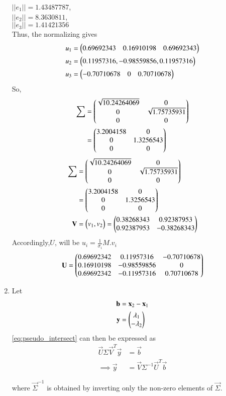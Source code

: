\documentclass[journal,12pt,twocolumn]{IEEEtran}
\renewcommand\thesection{\arabic{section}}
\begin{document}
\begin{enumerate}[label=\thesection.\arabic*.,ref=\thesection.\theenumi]
$||e_1||=1.43487787$,\\
$||e_2||=8.3630811$,\\
$||e_3||=1.41421356$\\
Thus, the normalizing gives 
\begin{align*}
&u_1=\begin{pmatrix}0.69692343 & 0.16910198 & 0.69692343\end{pmatrix}\\
&u_2=\begin{pmatrix}0.11957316,-0.98559856,0.11957316\end{pmatrix}\\
&u_3=\begin{pmatrix}-0.70710678 &0 & 0.70710678\end{pmatrix}
\end{align*}
So,
\begin{align*}
\sum&=\begin{pmatrix}\sqrt{10.24264069}	& 0\\0 & \sqrt{1.75735931}\\ 0 & 0\end{pmatrix} \\
&=\begin{pmatrix}3.2004158& 0\\0 & 1.3256543\\ 0 & 0\end{pmatrix}\\
\end{align*}
\begin{align*}
\sum&=\begin{pmatrix}\sqrt{10.24264069}	& 0\\0 & \sqrt{1.75735931}\\ 0 & 0\end{pmatrix} \\
&=\begin{pmatrix}3.2004158& 0\\0 & 1.3256543\\ 0 & 0\end{pmatrix}\\
\mathbf{V}&=\begin{pmatrix}v_1,v_2\end{pmatrix}=\begin{pmatrix}0.38268343 & 0.92387953\\ 0.92387953	& -0.38268343\end{pmatrix}\\
\end{align*}
Accordingly,$U$, will be $u_i=\frac{1}{\sigma_i}M.v_i$
\begin{align*}
\mathbf{U}=\begin{pmatrix}	0.69692342	& 0.11957316 & -0.70710678\\	
	0.16910198	& -0.98559856 & 0	\\
	0.69692342	&-0.11957316	& 0.70710678\end{pmatrix}
\end{align*}

\item Let
\begin{align*}
	\mathbf{b} &= 
	\mathbf{x}_2-\mathbf{x}_1
	\\
	\mathbf{y} &= \begin{pmatrix}\lambda_1 \\ - \lambda_2\end{pmatrix}
\end{align*}
\eqref{eq:pseudo_intersect}
can then be expressed as
\begin{align*}
\vec{U} \Sigma \vec{V}^T \vec{y} &= \vec{b}\\
\implies \vec{y} & = \vec{V}\Sigma^{-1} \vec{U}^T \vec{b}
\end{align*}

%
where $\vec{\Sigma}^{-1}$ is obtained by inverting  only the non-zero elements of $\vec{\Sigma}$.
\end{enumerate}
\end{document}
